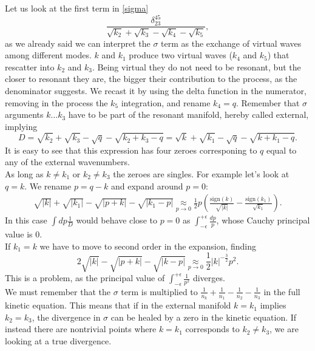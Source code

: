     Let us look at the first term in \eqref{sigma}
    \begin{equation}
        \frac{\delta_{23}^{45}}{\sqrt{k_2}+\sqrt{k_3}-\sqrt{k_4}-\sqrt{k_5}},
    \end{equation} 
    as we already said we can interpret the $\sigma$ term as the exchange of virtual waves among different modes.
    $k$ and $k_1$ produce two virtual waves ($k_4$ and $k_5$) that rescatter into $k_2$ and $k_3$.
    Being virtual they do not need to be resonant, but the closer to resonant they are, the bigger their contribution to the process, as the denominator suggests.   
    We recast it by using the delta function in the numerator, removing in the process the $k_5$ integration, and rename $k_4=q$. Remember that $\sigma$ arguments $k\dots k_3$ have to be part of the resonant manifold, hereby called external, implying  
    \begin{equation}
      D = \sqrt{k_2} + \sqrt{k_3} -\sqrt{q} - \sqrt{k_2 + k_3 - q} = \sqrt{k} + \sqrt{k_1} -\sqrt{q} - \sqrt{k + k_1 - q}.
    \end{equation}
    It is easy to see that this expression has four zeroes corresponing to $q$ equal to any of the external wavenumbers. \\
    As long as $k \neq k_1$ or $k_2 \neq k_3$ the zeroes are singles. For example let's look at $q = k$. We rename $p = q-k$ and expand around $p=0$:
    \begin{align*}
      \sqrt{|k|} + \sqrt{|k_1|} -\sqrt{|p+k|} - \sqrt{|k_1 - p|} \underset{p \rightarrow 0}{\approx} \frac{1}{2} p \left(\frac{\text{sign}(k)}{\sqrt{|k|}} - \frac{\text{sign}(k_1)}{\sqrt{k_1}}\right).
    \end{align*}
    In this case $\int dp\frac{1}{D}$ would behave close to $p=0$ as $\int_{-\epsilon}^{+\epsilon}\frac{dp}{p}$, whose Cauchy principal value is 0. \\
    If $k_1 = k$ we have to move to second order in the expansion, finding 
    \begin{equation}
      2\sqrt{|k|} -\sqrt{|p+k|} - \sqrt{|k - p|} \underset{p \rightarrow 0}{\approx} \frac{1}{2}|k|^{-\frac{3}{2}} p^2.
    \end{equation}
    This is a problem, as the principal value of $\int_{-\epsilon}^{+\epsilon}\frac{1}{p^2}$ diverges.\\
    We must remember that the $\sigma$ term is multiplied to $\frac{1}{n_k} + \frac{1}{n_1} -\frac{1}{n_2} -\frac{1}{n_3}$ in the full kinetic equation. This means that if in the external manifold $k = k_1$ implies $k_2 = k_3$, the divergence in $\sigma$ can be healed by a zero in the kinetic equation. If instead there are nontrivial points where $k=k_1$ corresponds to $k_2 \neq k_3$, we are looking at a true divergence.\\
